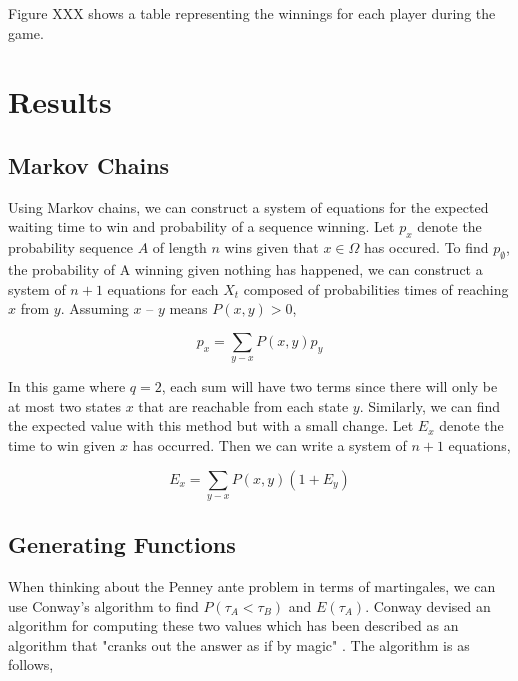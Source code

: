 \documentclass{article}
\numberwithin{mytheorem}{subsection} %
\begin{document}
		Figure XXX shows a table representing the winnings for each player during the game.

	\section{Results}
		\subsection{Markov Chains}
			Using Markov chains, we can construct a system of equations for the expected waiting time to win and probability of a sequence winning. Let $p_{x}$ denote the probability sequence $A$ of length $n$ wins given that $x\in\Omega$ has occured. To find $p_\emptyset$, the probability of A winning given nothing has happened, we can construct a system of $n+1$ equations for each $X_t$ composed of probabilities times of reaching $x$ from $y$. Assuming $x$ -- $y$ means $P(x,y) > 0$,

			$$p_x = \sum_{y - x} P(x,y) p_y$$

			In this game where $q=2$, each sum will have two terms since there will only be at most two states $x$ that are reachable from each state $y$. Similarly, we can find the expected value with this method but with a small change. Let $E_x$ denote the time to win given $x$ has occurred. Then we can write a system of $n+1$ equations,

			$$E_x = \sum_{y - x} P(x,y) (1 + E_y)$$


		\subsection{Generating Functions}
			When thinking about the Penney ante problem in terms of martingales, we can use Conway's algorithm to find $P(\tau_A < \tau_B)$ and $E(\tau_A)$. Conway devised an algorithm for computing these two values which has been described as an algorithm that "cranks out the answer as if by magic" \cite{gardner}. The algorithm is as follows,
\end{document}

